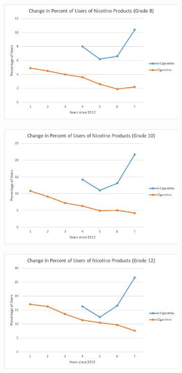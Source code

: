 \documentclass[12pt,letterpaper]{article}
\begin{document}
\begin{figure}[H]
  \centering
  \begin{subfigure}[t]{.3\linewidth}
  \includegraphics[width=\linewidth]{percentUsers8}
  \end{subfigure}
  \begin{subfigure}[t]{.3\linewidth}
  \includegraphics[width=\linewidth]{percentUsers10}
  \end{subfigure}
  \begin{subfigure}[t]{.3\linewidth}
  \includegraphics[width=\linewidth]{percentUsers12}
  \end{subfigure}
  

\end{figure}
\end{document}
